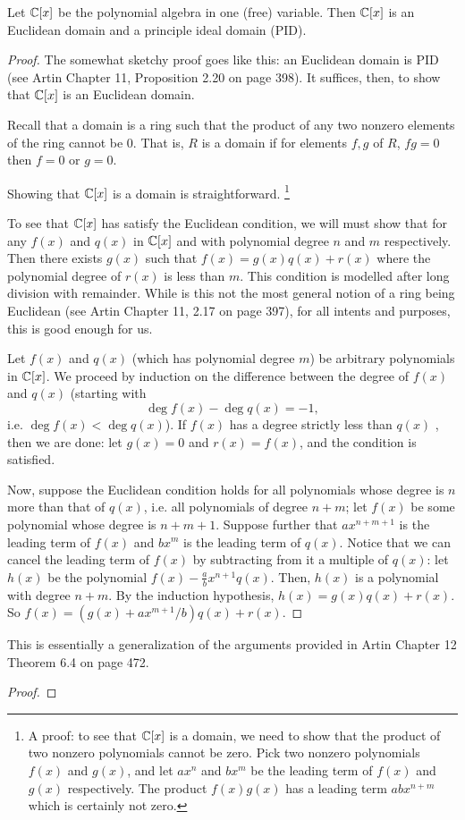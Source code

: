 \begin{lem}\label{lem:Cx_is_PID}
Let $\mathbb{C}[x]$ be the polynomial algebra in one (free) variable. Then
$\mathbb{C}[x]$ is an Euclidean domain and a principle ideal domain (PID).
\end{lem}
\begin{proof}
The somewhat sketchy proof goes like this: an Euclidean domain
is PID (see Artin Chapter 11, Proposition 2.20 on page 398). It 
suffices, then, to show that $\mathbb{C}[x]$ is an Euclidean domain.

Recall that a domain is a ring such that the product of any two 
nonzero elements of the ring cannot be $0$. That is, $R$ is a
domain if for elements $f, g$ of $R$, $fg = 0$ then $f = 0$ or
$g = 0$. 

Showing that $\mathbb{C}[x]$ is a domain is straightforward.
\footnote{A proof: to see that $\mathbb{C}[x]$ is a domain, we need to 
show that the product of two nonzero polynomials cannot be zero. 
Pick two nonzero polynomials $f(x)$ and $g(x)$, and let $ax^n$ and
$bx^m$ be the leading term of $f(x)$ and $g(x)$ respectively. The 
product $f(x)g(x)$ has a leading term $abx^{n + m}$ which is 
certainly not zero.}

To see that $\mathbb{C}[x]$ has satisfy the Euclidean condition, we will
must show that for any $f(x)$ and $q(x)$ in $\mathbb{C}[x]$ and with
polynomial degree $n$ and $m$ respectively. Then there exists
$g(x)$ such that $f(x) = g(x)q(x) + r(x)$ where the polynomial
degree of $r(x)$ is less than $m$. This condition is modelled 
after long division with remainder. While is this not the most
general notion of a ring being Euclidean (see Artin Chapter 11,
2.17 on page 397), for all intents and purposes, this is good
enough for us.

Let $f(x)$ and $q(x)$ (which has polynomial degree $m$) be 
arbitrary polynomials in $\mathbb{C}[x]$. We proceed by induction on the 
difference between the degree of $f(x)$ and $q(x)$ (starting with 
\[
\deg f(x) - \deg q(x) = -1,
\] 
i.e. $\deg f(x) < \deg q(x)$). If $f(x)$ has a degree strictly 
less than $q(x)$ , then we are done: let $g(x) = 0$ and $r(x) = 
f(x)$, and the condition is satisfied. 

Now, suppose the Euclidean condition holds for all polynomials 
whose degree is $n$ more than that of $q(x)$, i.e. all polynomials
of degree $n + m$; let $f(x)$ be some polynomial whose degree is 
$n + m + 1$. Suppose further that $ax^{n + m + 1}$ is the leading 
term of $f(x)$ and $bx^m$ is the leading term of $q(x)$. Notice
that we can cancel the leading term of $f(x)$ by subtracting from
it a multiple of $q(x)$: let $h(x)$ be the polynomial $f(x) - 
\frac{a}{b}x^{n + 1}q(x)$. Then, $h(x)$ is a polynomial with 
degree $n + m$. By the induction hypothesis, $h(x) = g(x)q(x) +
r(x)$. So $f(x) = (g(x) + ax^{m + 1}/b)q(x) + r(x)$.
\end{proof}

\begin{lem}
\end{lem}

This is essentially a generalization of the arguments provided
in Artin Chapter 12 Theorem 6.4 on page 472.

\begin{proof}

\end{proof}
